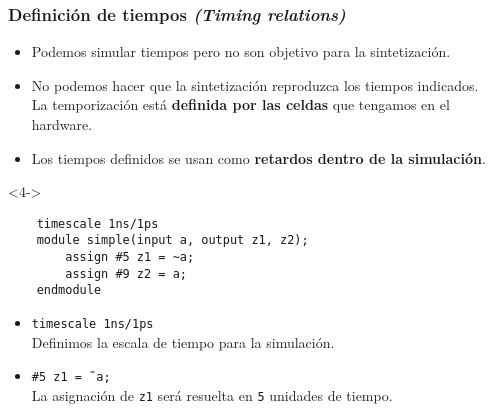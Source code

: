 \documentclass[aspectratio=169]{beamer}
\begin{document}
\begin{frame}[fragile,t]
    \frametitle{Definición de tiempos \emph{(Timing relations)}}
    \begin{itemize}
     \item<1-> Podemos simular tiempos pero no son objetivo para la sintetización.
     \item<2-> No podemos hacer que la sintetización reproduzca los tiempos indicados.\\
     La temporización está \textbf{definida por las celdas} que tengamos en el hardware.
     \item<3-> Los tiempos definidos se usan como \textbf{retardos dentro de la simulación}.
    \end{itemize}
    \begin{onlyenv}<4->
\begin{lstlisting}
    timescale 1ns/1ps
    module simple(input a, output z1, z2);
        assign #5 z1 = ~a;
        assign #9 z2 = a;
    endmodule
\end{lstlisting}
    \end{onlyenv}
    \small
    \begin{itemize}
     \item<4-> \texttt{timescale 1ns/1ps}\\
     \textcolor{verdeuca}{Definimos la escala de tiempo para la simulación.}
     \item<4-> \verb|#5 z1 = ˜a;|\\
     \textcolor{verdeuca}{La asignación de \texttt{z1} será resuelta en \texttt{5} unidades de tiempo.}
    \end{itemize}
\end{frame}
\end{document}

